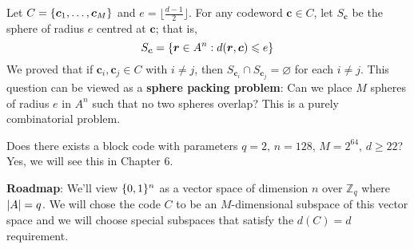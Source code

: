 Let $ C=\{\bm{c}_1,\ldots ,\bm{c}_M\} $ and $ e=\lfloor \frac{d-1}{2} \rfloor $.
For any codeword $ \bm{c}\in C $, let $ S_{\bm{c}} $ be the sphere of radius $ e $ centred at
$ \bm{c} $;
that is,
\[ S_{\bm{c}}= \{\bm{r}\in A^n:d(\bm{r},\bm{c})\leqslant e\} \]
We proved that if $ \bm{c}_i,\bm{c}_j\in C $ with $ i\neq j $,
then $ S_{\bm{c}_i}\cap S_{\bm{c}_j}= \varnothing $ for each $ i\neq j $.
This question can be viewed as a \textbf{sphere packing problem}:
Can we place $ M $ spheres of radius $ e $ in $ A^n $ such that
no two spheres overlap? This is a purely combinatorial problem.

Does there exists a block code with parameters
$ q=2,\,n=128,\,M=2^{64},\,d\geqslant 22 $? Yes, we will see this in Chapter 6.

\textbf{Roadmap}: We'll view $ \{0,1\}^{n} $ as a vector space of
dimension $ n $ over $ \mathbb{Z}_q $ where $ \lvert A\rvert=q $. We will chose the code
$ C $ to be an $ M $-dimensional subspace of this vector space
and we will choose special subspaces that satisfy the $ d(C)=d $ requirement.
